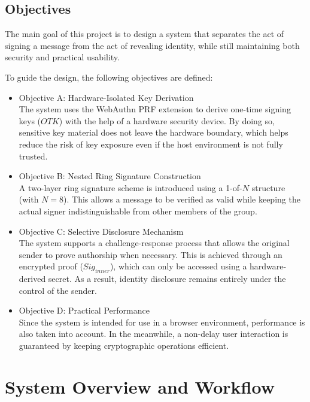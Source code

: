 \documentclass[letterpaper,11pt]{article}
\begin{document}
\subsection{Objectives}
The main goal of this project is to design a system that separates the act of signing a message from the act of revealing identity, while still maintaining both security and practical usability. 

To guide the design, the following objectives are defined:


\begin{itemize}
    \item{Objective A: Hardware-Isolated Key Derivation} \\
    The system uses the WebAuthn PRF extension to derive one-time signing keys ($OTK$) with the help of a hardware security device. By doing so, sensitive key material does not leave the hardware boundary, which helps reduce the risk of key exposure even if the host environment is not fully trusted.
    
    \item{Objective B: Nested Ring Signature Construction} \\
    A two-layer ring signature scheme is introduced using a 1-of-$N$ structure (with $N = 8$). This allows a message to be verified as valid while keeping the actual signer indistinguishable from other members of the group.
    
    \item{Objective C: Selective Disclosure Mechanism} \\
    The system supports a challenge-response process that allows the original sender to prove authorship when necessary. This is achieved through an encrypted proof ($Sig_{inner}$), which can only be accessed using a hardware-derived secret. As a result, identity disclosure remains entirely under the control of the sender.
    
    \item{Objective D: Practical Performance} \\
    Since the system is intended for use in a browser environment, performance is also taken into account. In the meanwhile, a non-delay user interaction is guaranteed by keeping cryptographic operations efficient.
\end{itemize}


\section{System Overview and Workflow}
\end{document}
